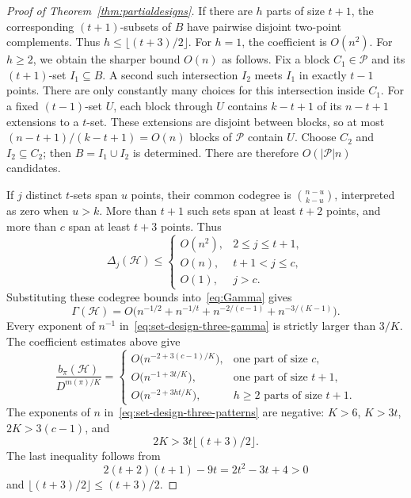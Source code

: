 \documentclass[11pt,reqno]{amsart}
\makeatletter
\numberwithin{equation}{section}
\theoremstyle{plain}
\newenvironment{claimproof}[1][Proof]{\par
    \pushQED{\qed}%
    \renewcommand{\qedsymbol}{$\blacksquare$}
    \normalfont \topsep6\p@\@plus6\p@\relax
    \trivlist
    \item[\hskip\labelsep
    \textit{#1}\@addpunct{.}~]\ignorespaces
}{%
    \popQED\endtrivlist\@endpefalse
}
\theoremstyle{definition}
\newcommand{\calH}{\mathcal{H}}
\newcommand{\calP}{\mathcal{P}}
\makeatother
\begin{document}
\begin{proof}[Proof of Theorem~\ref{thm:partialdesigns}]
\begin{claimproof}[Proof of Claim~\ref{clm:set-design-three}]
    If there are $h$ parts of size $t+1$, the corresponding $(t+1)$-subsets of $B$ have pairwise disjoint two-point complements.
    Thus $h\le\lfloor(t+3)/2\rfloor$.
    For $h=1$, the coefficient is $O(n^2)$.
    For $h\ge2$, we obtain the sharper bound $O(n)$ as follows.
    Fix a block $C_1\in\calP$ and its $(t+1)$-set $I_1\subseteq B$.
    A second such intersection $I_2$ meets $I_1$ in exactly $t-1$ points.
    There are only constantly many choices for this intersection inside $C_1$.
    For a fixed $(t-1)$-set $U$, each block through $U$ contains $k-t+1$ of its $n-t+1$ extensions to a $t$-set.
    These extensions are disjoint between blocks, so at most $(n-t+1)/(k-t+1)=O(n)$ blocks of $\calP$ contain $U$.
    Choose $C_2$ and $I_2\subseteq C_2$; then $B=I_1\cup I_2$ is determined.
    There are therefore $O(|\calP|n)$ candidates.

    If $j$ distinct $t$-sets span $u$ points, their common codegree is $\binom{n-u}{k-u}$, interpreted as zero when $u>k$.
    More than $t+1$ such sets span at least $t+2$ points, and more than $c$ span at least $t+3$ points.
    Thus
    \[
        \Delta_j(\calH)\le
        \begin{cases}
            O(n^2),&2\le j\le t+1,\\
            O(n),&t+1<j\le c,\\
            O(1),&j>c.
        \end{cases}
    \]
    Substituting these codegree bounds into~\eqref{eq:Gamma} gives
    \begin{equation}\label{eq:set-design-three-gamma}
        \Gamma(\calH)=O\bigl(n^{-1/2}+n^{-1/t}+n^{-2/(c-1)}+n^{-3/(K-1)}\bigr).
    \end{equation}
    Every exponent of $n^{-1}$ in~\eqref{eq:set-design-three-gamma} is strictly larger than $3/K$.
    The coefficient estimates above give
    \begin{equation}\label{eq:set-design-three-patterns}
        \frac{b_\pi(\calH)}{D^{m(\pi)/K}}=
        \begin{cases}
            O\bigl(n^{-2+3(c-1)/K}\bigr),&\text{one part of size }c,\\
            O\bigl(n^{-1+3t/K}\bigr),&\text{one part of size }t+1,\\
            O\bigl(n^{-2+3ht/K}\bigr),&\text{$h\ge2$ parts of size }t+1.
        \end{cases}
    \end{equation}
    The exponents of $n$ in~\eqref{eq:set-design-three-patterns} are negative: $K>6$, $K>3t$, $2K>3(c-1)$, and
    \[
        2K>3t\lfloor(t+3)/2\rfloor.
    \]
    The last inequality follows from
    \[
        2(t+2)(t+1)-9t=2t^2-3t+4>0
    \]
    and $\lfloor(t+3)/2\rfloor\le(t+3)/2$.


\end{claimproof}
\end{proof}
\end{document}
